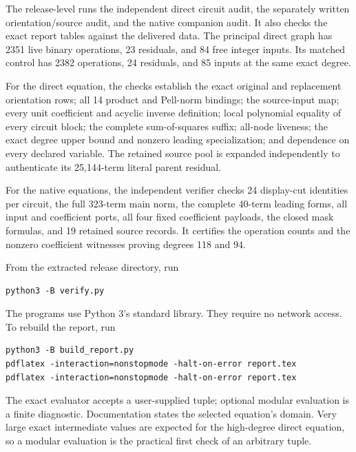 The release-level  runs the independent direct circuit audit, the separately written orientation/source audit, and the native companion audit. It also checks the exact report tables against the delivered data. The principal direct graph has 2351 live binary operations, 23 residuals, and 84 free integer inputs. Its matched control has 2382 operations, 24 residuals, and 85 inputs at the same exact degree.

For the direct equation, the checks establish the exact original and replacement orientation rows; all 14 product and Pell-norm bindings; the source-input map; every unit coefficient and acyclic inverse definition; local polynomial equality of every circuit block; the complete sum-of-squares suffix; all-node liveness; the exact degree upper bound and nonzero leading specialization; and dependence on every declared variable. The retained source pool is expanded independently to authenticate its 25,144-term literal parent residual.

For the native equations, the independent verifier checks 24 display-cut identities per circuit, the full 323-term main norm, the complete 40-term leading forms, all input and coefficient ports, all four fixed coefficient payloads, the closed mask formulas, and 19 retained source records. It certifies the operation counts and the nonzero coefficient witnesses proving degrees 118 and 94.

From the extracted release directory, run
\begin{verbatim}
python3 -B verify.py
\end{verbatim}
The programs use Python 3's standard library. They require no network access. To rebuild the report, run
\begin{verbatim}
python3 -B build_report.py
pdflatex -interaction=nonstopmode -halt-on-error report.tex
pdflatex -interaction=nonstopmode -halt-on-error report.tex
\end{verbatim}
The exact evaluator accepts a user-supplied tuple; optional modular evaluation is a finite diagnostic. Documentation states the selected equation's domain. Very large exact intermediate values are expected for the high-degree direct equation, so a modular evaluation is the practical first check of an arbitrary tuple.
